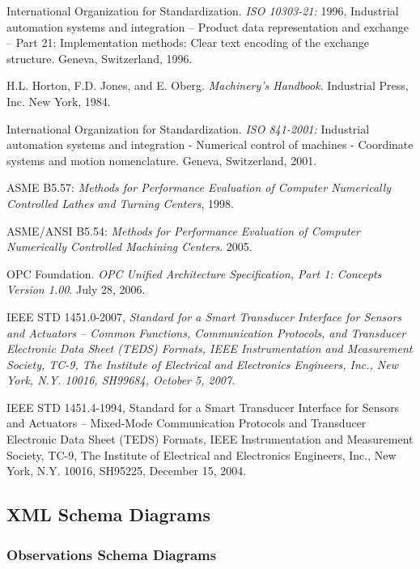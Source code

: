 International Organization for Standardization. \textit{ISO 10303-21:} 1996, Industrial automation systems and integration -- Product data representation and exchange -- Part 21: Implementation methods: Clear text encoding of the exchange structure. Geneva, Switzerland, 1996.

H.L. Horton, F.D. Jones, and E. Oberg. \textit{Machinery's Handbook}. Industrial Press, Inc. New York, 1984.

International Organization for Standardization. \textit{ISO 841-2001:} Industrial automation systems and integration - Numerical control of machines - Coordinate systems and motion nomenclature. Geneva, Switzerland, 2001.

ASME B5.57: \textit{Methods for Performance Evaluation of Computer Numerically Controlled Lathes and Turning Centers}, 1998.

ASME/ANSI B5.54: \textit{Methods for Performance Evaluation of Computer Numerically Controlled Machining Centers}. 2005.

OPC Foundation. \textit{OPC Unified Architecture Specification, Part 1: Concepts Version 1.00}. July 28, 2006.

IEEE STD 1451.0-2007, \textit{Standard for a Smart Transducer Interface for Sensors and Actuators – Common Functions, Communication Protocols, and Transducer Electronic Data Sheet (TEDS) Formats, IEEE Instrumentation and Measurement Society, TC-9, The Institute of Electrical and Electronics Engineers, Inc., New York, N.Y. 10016, SH99684, October 5, 2007.}

IEEE STD 1451.4-1994, Standard for a Smart Transducer Interface for Sensors and Actuators – Mixed-Mode Communication Protocols and Transducer Electronic Data Sheet (TEDS) Formats, IEEE Instrumentation and Measurement Society, TC-9, The Institute of Electrical and Electronics Engineers, Inc., New York, N.Y. 10016, SH95225, December 15, 2004. \newpage 

\subsection{XML Schema Diagrams}
\label{sec:XML Schema Diagrams}

\subsubsection{Observations Schema Diagrams}
\label{sec:Observations Schema Diagrams}

